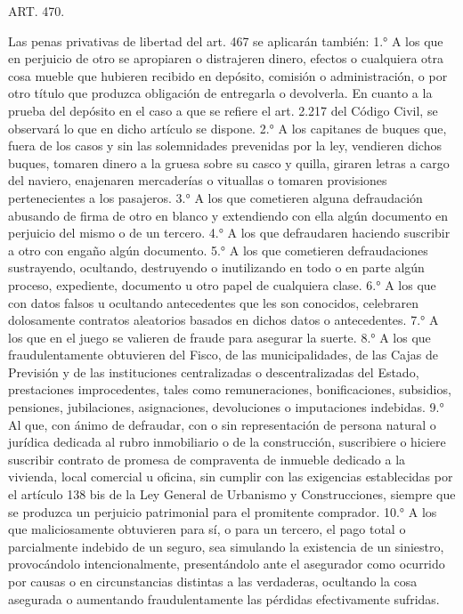     ART. 470.

    Las penas privativas de libertad del art. 467 se aplicarán también:
    1.° A los que en perjuicio de otro se apropiaren o distrajeren dinero, efectos o cualquiera otra cosa mueble que hubieren recibido en depósito, comisión o administración, o por otro título que produzca obligación de entregarla o devolverla.
    En cuanto a la prueba del depósito en el caso a que se refiere el art. 2.217 del Código Civil, se observará lo que en dicho artículo se dispone.
    2.° A los capitanes de buques que, fuera de los casos y sin las solemnidades prevenidas por la ley, vendieren dichos buques, tomaren dinero a la gruesa sobre su casco y quilla, giraren letras a cargo del naviero, enajenaren mercaderías o vituallas o tomaren provisiones pertenecientes a los pasajeros.
    3.° A los que cometieren alguna defraudación abusando de firma de otro en blanco y extendiendo con ella algún documento en perjuicio del mismo o de un tercero.
    4.° A los que defraudaren haciendo suscribir a otro con engaño algún documento.
    5.° A los que cometieren defraudaciones sustrayendo, ocultando, destruyendo o inutilizando en todo o en parte algún proceso, expediente, documento u otro papel de cualquiera clase.
    6.° A los que con datos falsos u ocultando antecedentes que les son conocidos, celebraren dolosamente contratos aleatorios basados en dichos datos o antecedentes.
    7.° A los que en el juego se valieren de fraude para asegurar la suerte.
    8.° A los que fraudulentamente obtuvieren del Fisco, de las municipalidades, de las Cajas de Previsión y de las instituciones centralizadas o descentralizadas del Estado, prestaciones improcedentes, tales como remuneraciones, bonificaciones, subsidios, pensiones, jubilaciones, asignaciones, devoluciones o imputaciones indebidas.
    9.° Al que, con ánimo de defraudar, con o sin representación de persona natural o jurídica dedicada al rubro inmobiliario o de la construcción, suscribiere o hiciere suscribir contrato de promesa de compraventa de inmueble dedicado a la vivienda, local comercial u oficina, sin cumplir con las exigencias establecidas por el artículo 138 bis de la Ley General de Urbanismo y Construcciones, siempre que se produzca un perjuicio patrimonial para el promitente comprador.
    10.° A los que maliciosamente obtuvieren para sí, o para un tercero, el pago total o parcialmente indebido de un seguro, sea simulando la existencia de un siniestro, provocándolo intencionalmente, presentándolo ante el asegurador como ocurrido por causas o en circunstancias distintas a las verdaderas, ocultando la cosa asegurada o aumentando fraudulentamente las pérdidas efectivamente sufridas.
